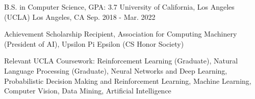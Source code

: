 

\begin{cventries}

  \cventry
    {B.S. in Computer Science, GPA: 3.7} %
    {University of California, Los Angeles (UCLA)} %
    {Los Angeles, CA} %
    {Sep. 2018 - Mar. 2022} %
    {
      \begin{cvitems} %
        \item {Achievement Scholarship Recipient, Association for Computing Machinery
        (President of AI), Upsilon Pi Epsilon (CS Honor Society)}
        \item {Relevant UCLA Coursework: Reinforcement Learning (Graduate), Natural Language Processing (Graduate),
        Neural Networks and Deep Learning, Probabilistic Decision Making and Reinforcement 
        Learning, Machine Learning, Computer Vision, Data Mining, Artificial Intelligence}
      \end{cvitems}
    }

\end{cventries}

